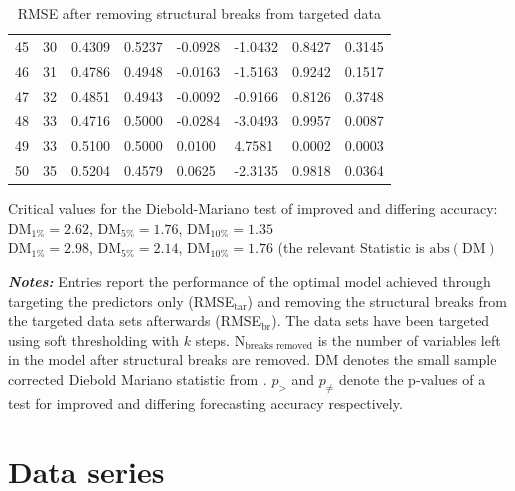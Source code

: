 \documentclass[12pt]{article}
\begin{document}
\begin{table}[htp]
\begin{tabular}{cc|lll|lll}
			45 & 30 & 0.4309 & 0.5237 & -0.0928 & -1.0432 & 0.8427 & 0.3145 \\
			46 & 31 & 0.4786 & 0.4948 & -0.0163 & -1.5163 & 0.9242 & 0.1517 \\
			47 & 32 & 0.4851 & 0.4943 & -0.0092 & -0.9166 & 0.8126 & 0.3748 \\
			48 & 33 & 0.4716 & 0.5000 & -0.0284 & -3.0493 & 0.9957 & 0.0087 \\ 
			49 & 33 & 0.5100 & 0.5000 & 0.0100 & 4.7581 & 0.0002 & 0.0003 \\
			50 & 35 & 0.5204 & 0.4579 & 0.0625 & -2.3135 & 0.9818 & 0.0364 \\ 
		\hline
	\end{tabular}
	\begin{minipage}{14cm}
		Critical values for the Diebold-Mariano test of improved and differing accuracy: \\ DM$_{1\%} = 2.62$, DM$_{5\%} = 1.76$, DM$_{10\%} = 1.35$ \\ DM$_{1\%} = 2.98$, DM$_{5\%} = 2.14$, DM$_{10\%} = 1.76$ (the relevant Statistic is $\text{abs}(\text{DM})$
	\end{minipage}
	\begin{minipage}{16cm}
		\small{\textbf{\textit{Notes:}} Entries report the performance of the optimal model achieved through targeting the predictors only (RMSE$_{\text{tar}}$) and removing the structural breaks from the targeted data sets afterwards (RMSE$_{\text{br}}$). The data sets have been targeted using soft thresholding with $k$ steps. N$_{\text{breaks removed}}$ is the number of variables left in the model after structural breaks are removed. DM denotes the small sample corrected Diebold Mariano statistic from \citet{harvey1997testing}. $p_>$ and $p_{\not =}$ denote the p-values of a test for improved and differing forecasting accuracy respectively.}
	\end{minipage}
	\caption{RMSE after removing structural breaks from targeted data}
	\label{diff rmse by removing breaks after targeting}
\end{table}





\clearpage
\newpage

\section{Data series}
\label{Data series}
\end{document}
